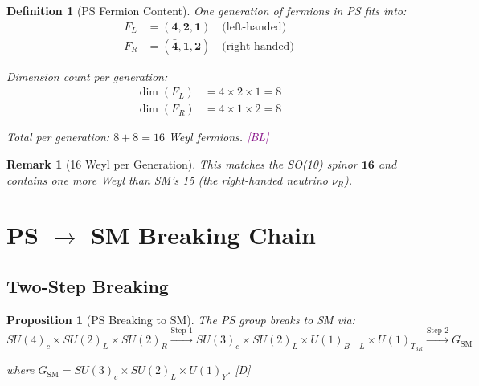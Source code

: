 \documentclass[11pt,a4paper]{article}
\newtheorem{proposition}[theorem]{Proposition}
\newtheorem{definition}[theorem]{Definition}
\newtheorem{remark}[theorem]{Remark}
\newcommand{\tagD}{\textcolor{blue!70!black}{[D]}}
\newcommand{\tagBL}{\textcolor{purple}{[BL]}}
\begin{document}
\begin{definition}[PS Fermion Content]
\label{def:ps-fermions}
One generation of fermions in PS fits into:
\begin{align}
\label{eq:ps-rep-L}
F_L &= (\mathbf{4}, \mathbf{2}, \mathbf{1}) \quad \text{(left-handed)} \\
\label{eq:ps-rep-R}
F_R &= (\bar{\mathbf{4}}, \mathbf{1}, \mathbf{2}) \quad \text{(right-handed)}
\end{align}

Dimension count per generation:
\begin{align}
\label{eq:dim-FL}
\dim(F_L) &= 4 \times 2 \times 1 = 8 \\
\label{eq:dim-FR}
\dim(F_R) &= 4 \times 1 \times 2 = 8
\end{align}

Total per generation: $8 + 8 = 16$ Weyl fermions.
\tagBL
\end{definition}

\begin{remark}[16 Weyl per Generation]
\label{rem:16-weyl}
This matches the SO(10) spinor $\mathbf{16}$ and contains one more Weyl than SM's 15
(the right-handed neutrino $\nu_R$).
\end{remark}

\section{PS $\to$ SM Breaking Chain}
\label{sec:breaking}

\subsection{Two-Step Breaking}

\begin{proposition}[PS Breaking to SM]
\label{prop:ps-breaking}
The PS group breaks to SM via:
\begin{equation}
\label{eq:breaking-chain}
\boxed{SU(4)_c \times SU(2)_L \times SU(2)_R \xrightarrow{\text{Step 1}} SU(3)_c \times SU(2)_L \times U(1)_{B-L} \times U(1)_{T_{3R}} \xrightarrow{\text{Step 2}} G_{\text{SM}}}
\end{equation}

where $G_{\text{SM}} = SU(3)_c \times SU(2)_L \times U(1)_Y$.
\tagD
\end{proposition}
\end{document}
